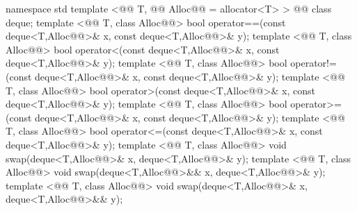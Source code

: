 \documentclass[american,twoside]{book}
\begin{document}
\begin{codeblock}
namespace std {
  template <@@ T, @@ Alloc@@ = allocator<T> > 
    @@
    class deque;
  template <@@ T, class Alloc@@>
    bool operator==(const deque<T,Alloc@@>& x, const deque<T,Alloc@@>& y);
  template <@@ T, class Alloc@@>
    bool operator<(const deque<T,Alloc@@>& x, const deque<T,Alloc@@>& y);
  template <@@ T, class Alloc@@>
    bool operator!=(const deque<T,Alloc@@>& x, const deque<T,Alloc@@>& y);
  template <@@ T, class Alloc@@>
    bool operator>(const deque<T,Alloc@@>& x, const deque<T,Alloc@@>& y);
  template <@@ T, class Alloc@@>
    bool operator>=(const deque<T,Alloc@@>& x, const deque<T,Alloc@@>& y);
  template <@@ T, class Alloc@@>
    bool operator<=(const deque<T,Alloc@@>& x, const deque<T,Alloc@@>& y);
  template <@@ T, class Alloc@@>
    void swap(deque<T,Alloc@@>& x, deque<T,Alloc@@>& y);
  template <@@ T, class Alloc@@>
    void swap(deque<T,Alloc@@>&& x, deque<T,Alloc@@>& y);
  template <@@ T, class Alloc@@>
    void swap(deque<T,Alloc@@>& x, deque<T,Alloc@@>&& y);
}
\end{codeblock}

%
\end{document}
